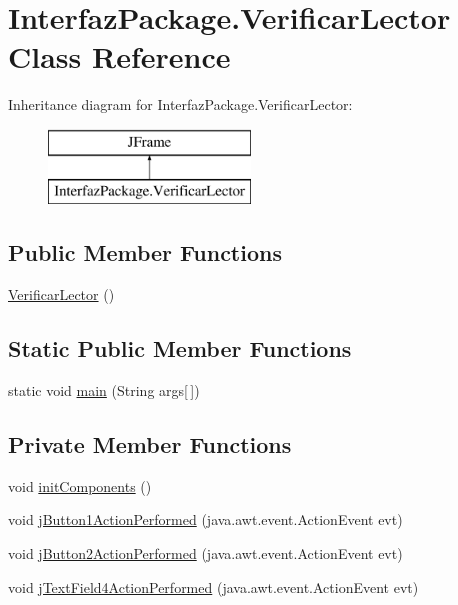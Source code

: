 \hypertarget{class_interfaz_package_1_1_verificar_lector}{}\section{Interfaz\+Package.\+Verificar\+Lector Class Reference}
\label{class_interfaz_package_1_1_verificar_lector}
Inheritance diagram for Interfaz\+Package.\+Verificar\+Lector\+:\begin{figure}[H]
\begin{center}
\leavevmode
\includegraphics[height=2.000000cm]{class_interfaz_package_1_1_verificar_lector}
\end{center}
\end{figure}
\subsection*{Public Member Functions}
\begin{DoxyCompactItemize}
\item 
\mbox{\hyperlink{class_interfaz_package_1_1_verificar_lector_a417a34478f55e6f453adbbb351381962}{Verificar\+Lector}} ()
\end{DoxyCompactItemize}
\subsection*{Static Public Member Functions}
\begin{DoxyCompactItemize}
\item 
static void \mbox{\hyperlink{class_interfaz_package_1_1_verificar_lector_aae4c6809280705388d4de426bc738c83}{main}} (String args\mbox{[}$\,$\mbox{]})
\end{DoxyCompactItemize}
\subsection*{Private Member Functions}
\begin{DoxyCompactItemize}
\item 
void \mbox{\hyperlink{class_interfaz_package_1_1_verificar_lector_ab5abc778d7b6eb2a5799d72d9653e5f6}{init\+Components}} ()
\item 
void \mbox{\hyperlink{class_interfaz_package_1_1_verificar_lector_ab1cf48292f59166c5e4b0e9a45202b48}{j\+Button1\+Action\+Performed}} (java.\+awt.\+event.\+Action\+Event evt)
\item 
void \mbox{\hyperlink{class_interfaz_package_1_1_verificar_lector_ac3ea56de497dffbeb0168dcf600f6583}{j\+Button2\+Action\+Performed}} (java.\+awt.\+event.\+Action\+Event evt)
\item 
void \mbox{\hyperlink{class_interfaz_package_1_1_verificar_lector_a701cb158bcbf5e7944c26e7980de4cb6}{j\+Text\+Field4\+Action\+Performed}} (java.\+awt.\+event.\+Action\+Event evt)
\end{DoxyCompactItemize}
